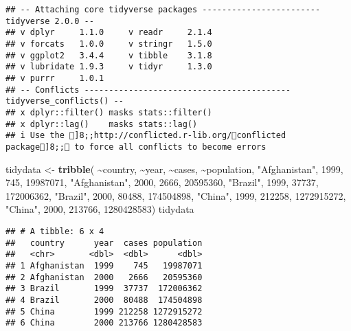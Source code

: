 \documentclass[
]{article}
\newenvironment{Shaded}{\begin{snugshade}}{\end{snugshade}}
\newcommand{\DecValTok}[1]{\textcolor[rgb]{0.00,0.00,0.81}{#1}}
\newcommand{\FunctionTok}[1]{\textcolor[rgb]{0.13,0.29,0.53}{\textbf{#1}}}
\newcommand{\NormalTok}[1]{#1}
\newcommand{\OtherTok}[1]{\textcolor[rgb]{0.56,0.35,0.01}{#1}}
\newcommand{\SpecialCharTok}[1]{\textcolor[rgb]{0.81,0.36,0.00}{\textbf{#1}}}
\newcommand{\StringTok}[1]{\textcolor[rgb]{0.31,0.60,0.02}{#1}}
\begin{document}
\begin{verbatim}
## -- Attaching core tidyverse packages ------------------------ tidyverse 2.0.0 --
## v dplyr     1.1.0     v readr     2.1.4
## v forcats   1.0.0     v stringr   1.5.0
## v ggplot2   3.4.4     v tibble    3.1.8
## v lubridate 1.9.3     v tidyr     1.3.0
## v purrr     1.0.1     
## -- Conflicts ------------------------------------------ tidyverse_conflicts() --
## x dplyr::filter() masks stats::filter()
## x dplyr::lag()    masks stats::lag()
## i Use the ]8;;http://conflicted.r-lib.org/conflicted package]8;; to force all conflicts to become errors
\end{verbatim}

\begin{Shaded}
\begin{Highlighting}[]
\NormalTok{tidydata }\OtherTok{\textless{}{-}} \FunctionTok{tribble}\NormalTok{(}
\SpecialCharTok{\textasciitilde{}}\NormalTok{country, }\SpecialCharTok{\textasciitilde{}}\NormalTok{year, }\SpecialCharTok{\textasciitilde{}}\NormalTok{cases, }\SpecialCharTok{\textasciitilde{}}\NormalTok{population,}
\StringTok{"Afghanistan"}\NormalTok{, }\DecValTok{1999}\NormalTok{, }\DecValTok{745}\NormalTok{, }\DecValTok{19987071}\NormalTok{,}
\StringTok{"Afghanistan"}\NormalTok{, }\DecValTok{2000}\NormalTok{, }\DecValTok{2666}\NormalTok{, }\DecValTok{20595360}\NormalTok{,}
\StringTok{"Brazil"}\NormalTok{, }\DecValTok{1999}\NormalTok{, }\DecValTok{37737}\NormalTok{, }\DecValTok{172006362}\NormalTok{,}
\StringTok{"Brazil"}\NormalTok{, }\DecValTok{2000}\NormalTok{, }\DecValTok{80488}\NormalTok{, }\DecValTok{174504898}\NormalTok{,}
\StringTok{"China"}\NormalTok{, }\DecValTok{1999}\NormalTok{, }\DecValTok{212258}\NormalTok{, }\DecValTok{1272915272}\NormalTok{,}
\StringTok{"China"}\NormalTok{, }\DecValTok{2000}\NormalTok{, }\DecValTok{213766}\NormalTok{, }\DecValTok{1280428583}\NormalTok{)}
\NormalTok{tidydata}
\end{Highlighting}
\end{Shaded}

\begin{verbatim}
## # A tibble: 6 x 4
##   country      year  cases population
##   <chr>       <dbl>  <dbl>      <dbl>
## 1 Afghanistan  1999    745   19987071
## 2 Afghanistan  2000   2666   20595360
## 3 Brazil       1999  37737  172006362
## 4 Brazil       2000  80488  174504898
## 5 China        1999 212258 1272915272
## 6 China        2000 213766 1280428583
\end{verbatim}
\end{document}
